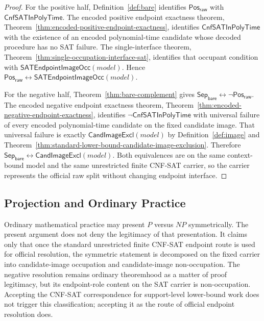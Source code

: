 \documentclass[11pt]{article}
\theoremstyle{definition}
\theoremstyle{remark}
\newcommand{\PosRaw}{\mathsf{Pos}_{\mathsf{raw}}}
\newcommand{\SepBare}{\mathsf{Sep}_{\mathsf{bare}}}
\newcommand{\CnfSATP}{\mathsf{CnfSATInPolyTime}}
\newcommand{\CandImageExcl}{\mathsf{CandImageExcl}}
\newcommand{\SATEndpointImageOcc}{\mathsf{SATEndpointImageOcc}}
\begin{document}
\begin{proof}
For the positive half, Definition~\ref{def:bare} identifies \(\PosRaw\) with \(\CnfSATP\). The encoded positive endpoint exactness theorem, Theorem~\ref{thm:encoded-positive-endpoint-exactness}, identifies \(\CnfSATP\) with the existence of an encoded polynomial-time candidate whose decoded procedure has no SAT failure. The single-interface theorem, Theorem~\ref{thm:single-occupation-interface-sat}, identifies that occupant condition with \(\SATEndpointImageOcc(model)\). Hence \(\PosRaw\leftrightarrow\SATEndpointImageOcc(model)\).

For the negative half, Theorem~\ref{thm:bare-complement} gives \(\SepBare\leftrightarrow\neg\PosRaw\). The encoded negative endpoint exactness theorem, Theorem~\ref{thm:encoded-negative-endpoint-exactness}, identifies \(\neg\CnfSATP\) with universal failure of every encoded polynomial-time candidate on the fixed candidate image. That universal failure is exactly \(\CandImageExcl(model)\) by Definition~\ref{def:image} and Theorem~\ref{thm:standard-lower-bound-candidate-image-exclusion}. Therefore \(\SepBare\leftrightarrow\CandImageExcl(model)\). Both equivalences are on the same context-bound model and the same unrestricted finite CNF-SAT carrier, so the carrier represents the official raw split without changing endpoint interface.
\end{proof}



\subsection{Projection and Ordinary Practice}\label{subsec:projection-ordinary-practice}

Ordinary mathematical practice may present \(P\) versus \(NP\) symmetrically. The present argument does not deny the legitimacy of that presentation. It claims only that once the standard unrestricted finite CNF-SAT endpoint route is used for official resolution, the symmetric statement is decomposed on the fixed carrier into candidate-image occupation and candidate-image non-occupation. The negative resolution remains ordinary theoremhood as a matter of proof legitimacy, but its endpoint-role content on the SAT carrier is non-occupation. Accepting the CNF-SAT correspondence for support-level lower-bound work does not trigger this classification; accepting it as the route of official endpoint resolution does.
\end{document}
